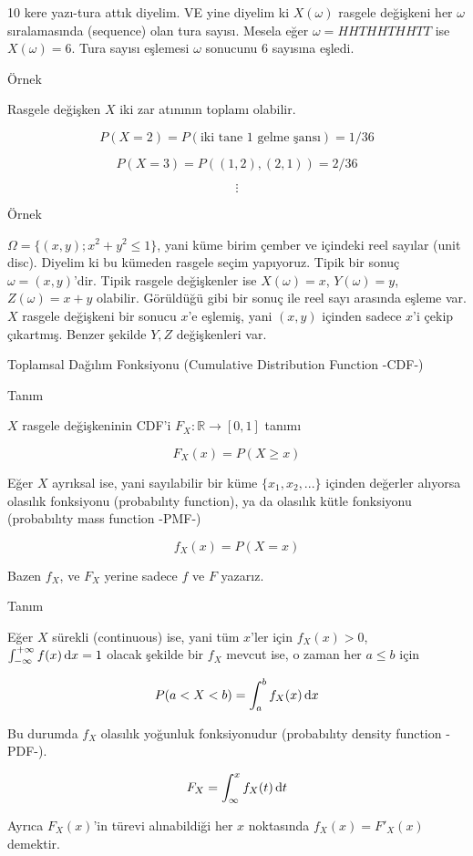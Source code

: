 \documentclass[12pt,fleqn]{article}\usepackage{../../common}
\begin{document}
10 kere yazı-tura attık diyelim. VE yine diyelim ki $X(\omega)$ rasgele
değişkeni her $\omega$ sıralamasında (sequence) olan tura sayısı. Mesela
eğer $\omega = HHTHHTHHTT$ ise $X(\omega) = 6$. Tura sayısı eşlemesi
$\omega$ sonucunu 6 sayısına eşledi.

Örnek

Rasgele değişken $X$ iki zar atınının toplamı olabilir. 

$$ P(X=2) = P(\textrm{iki tane 1 gelme şansı}) = 1/36 $$

$$ P(X=3) = P((1,2),(2,1)) = 2/36 $$

$$ \vdots $$

Örnek 

$\Omega = \{ (x,y); x^2+y^2 \le 1 \}$, yani küme birim çember ve içindeki
reel sayılar (unit disc). Diyelim ki bu kümeden rasgele seçim
yapıyoruz. Tipik bir sonuç $\omega = (x,y)$'dir. Tipik rasgele değişkenler
ise $X(\omega) = x$, $Y(\omega) = y$, $Z(\omega) = x+y$ olabilir. Görüldüğü
gibi bir sonuç ile reel sayı arasında eşleme var. $X$ rasgele değişkeni
bir sonucu $x$'e eşlemiş, yani $(x,y)$ içinden sadece $x$'i çekip
çıkartmış. Benzer şekilde $Y,Z$ değişkenleri var. 

Toplamsal Dağılım Fonksiyonu (Cumulative Distribution Function -CDF-)

Tanım

$X$ rasgele değişkeninin CDF'i $F_X: \mathbb{R} \to [0,1]$ tanımı

$$ F_X(x) = P(X \ge x) $$

Eğer $X$ ayrıksal ise, yani sayılabilir bir küme $\{x_1,x_2,...\}$ içinden
değerler alıyorsa olasılık fonksiyonu (probabılıty function), ya da
olasılık kütle fonksiyonu (probabılıty mass function -PMF-) 

$$ f_X(x) = P(X = x) $$

Bazen $f_X$, ve $F_X$ yerine sadece $f$ ve $F$ yazarız.

Tanım

Eğer $X$ sürekli (continuous) ise, yani tüm $x$'ler için $f_X(x) > 0$,
$\int_{-\infty}^{+\infty}f(x) \,\mathrm{d} x = 1$ olacak şekilde bir $f_X$ mevcut ise, o
zaman her $a \le b$ için

$$ P(a<X<b) = \int_{a}^{b}f_X(x) \,\mathrm{d} x $$

Bu durumda $f_X$ olasılık yoğunluk fonksiyonudur (probabılıty density function
-PDF-). 

$$ F_X = \int_{\infty}^{x}f_X(t) \,\mathrm{d} t $$

Ayrıca $F_X(x)$'in türevi alınabildiği her $x$ noktasında  $f_X(x) = F'_X(x)$
demektir. 
\end{document}
